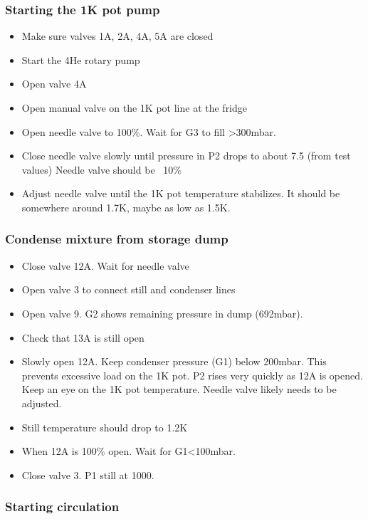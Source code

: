 \subsubsection*{Starting the 1K pot pump}

\begin{itemize}
\item Make sure valves 1A, 2A, 4A, 5A are closed
\item Start the 4He rotary pump
\item Open valve 4A
\item Open manual valve on the 1K pot line at the fridge
\item Open needle valve to 100\%. Wait for G3 to fill >300mbar. 
\item Close needle valve slowly until pressure in P2 drops to about 7.5 (from test values) Needle valve should be ~10\%
\item Adjust needle valve until the 1K pot temperature stabilizes. It should be somewhere around 1.7K, maybe as low as 1.5K.
\end{itemize}

\subsubsection*{Condense mixture from storage dump}
\begin{itemize}
\item Close valve 12A. Wait for needle valve
\item Open valve 3 to connect still and condenser lines
\item Open valve 9. G2 shows remaining pressure in dump (692mbar).
\item Check that 13A is still open
\item Slowly open 12A. Keep condenser pressure (G1) below 200mbar. This prevents excessive load on the 1K pot. P2 rises very quickly as 12A is opened. Keep an eye on the 1K pot temperature. Needle valve likely needs to be adjusted.
\item Still temperature should drop to 1.2K
\item When 12A is 100\% open. Wait for G1<100mbar.
\item Close valve 3. P1 still at 1000.
\end{itemize}

\subsubsection*{Starting circulation}

